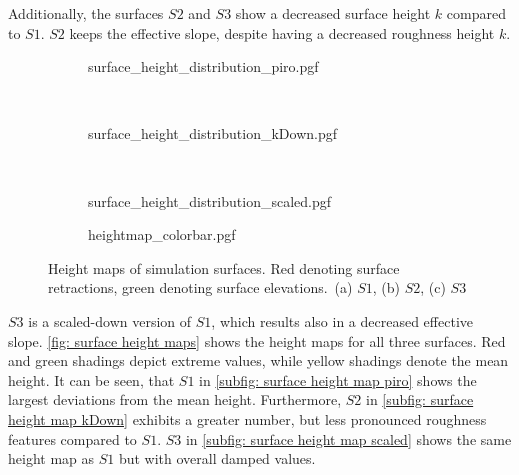 Additionally, the surfaces $S2$ and $S3$ show a decreased surface height $k$ compared to $S1$.
$S2$ keeps the effective slope, despite having a decreased roughness height $k$.
\begin{figure}
    \centering
    \begin{subfigure}{0.8\textwidth}
        \centering
        \subcaption{}
        {surface_height_distribution_piro.pgf}
        \label{subfig: surface height map piro}
    \end{subfigure}
    \\[-20pt]
    \begin{subfigure}{0.8\textwidth}
        \centering
        \subcaption{}
        {surface_height_distribution_kDown.pgf}
        \label{subfig: surface height map kDown}
    \end{subfigure}
    \\[-20pt]
    \begin{subfigure}{0.8\textwidth}
        \centering
        \subcaption{}
        {surface_height_distribution_scaled.pgf}
        \label{subfig: surface height map scaled}
    \end{subfigure}
    \begin{subfigure}{0.8\textwidth}
        \centering
        \hspace{0.5cm}
        {heightmap_colorbar.pgf}
    \end{subfigure}
    \caption[Height maps of simulation surfaces]{Height maps of simulation surfaces. Red denoting surface retractions, green denoting surface elevations.~(a) $S1$, (b) $S2$, (c) $S3$}
    \label{fig: surface height maps}
\end{figure}

$S3$ is a scaled-down version of $S1$, which results also in a decreased effective slope.
\autoref{fig: surface height maps} shows the height maps for all three surfaces.
Red and green shadings depict extreme values, while yellow shadings denote the mean height.
It can be seen, that $S1$ in \autoref{subfig: surface height map piro} shows the largest deviations from the mean height.
Furthermore, $S2$ in \autoref{subfig: surface height map kDown} exhibits a greater number, but less pronounced roughness features compared to $S1$. 
$S3$ in \autoref{subfig: surface height map scaled} shows the same height map as $S1$ but with overall damped values.

